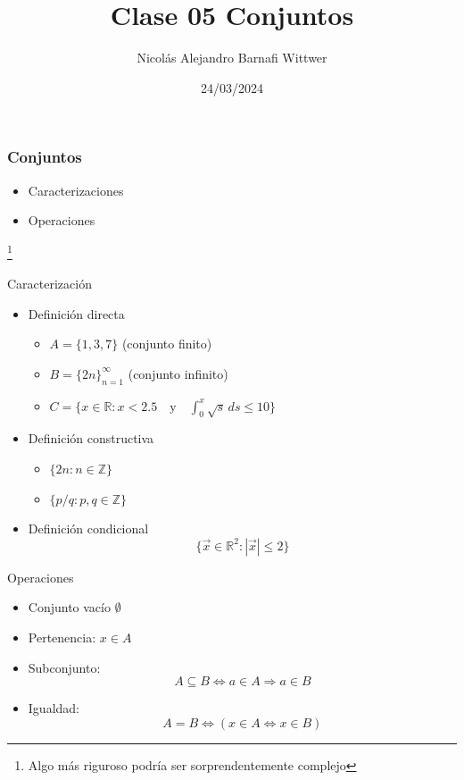 \documentclass[14pt,aspectratio=169,xcolor=dvipsnames]{beamer}
\title[short title]{Clase 05 Conjuntos}
\subtitle{}
\author[NA Barnafi] {Nicolás Alejandro Barnafi Wittwer}
\institute[UC|CMM] 
{
    Pontificia Universidad Católica de Chile \\
    Centro de Modelamiento Matemático
}
\date{24/03/2024}
\begin{document}
\begin{frame}
    \maketitle
\end{frame}
\begin{frame}\frametitle{Conjuntos}
    \begin{itemize}
        \item Caracterizaciones
        \item Operaciones
    \end{itemize}
    \footnote{Algo más riguroso podría ser sorprendentemente complejo}

    \vspace{1cm}
\end{frame}
\begin{frame}{Caracterización}
    \begin{itemize}
        \item Definición directa
            \begin{itemize}
                \item $A = \{1,3,7\}$ (conjunto finito)
                \item $B = \{2n\}_{n=1}^\infty$ (conjunto infinito)  
                \item $C = \{x \in \mathbb R: x < 2.5 \quad\text{y}\quad  \int_0^x \sqrt s \,ds \leq 10 \} $ 
            \end{itemize}
        \item Definición constructiva
            \begin{itemize}
                \item $\{ 2n : n \in \mathbb Z \}$ 
                \item $\{p / q : p,q \in \mathbb Z\}$
            \end{itemize}
        \item Definición condicional
            $$ \{\vec x \in \mathbb R^2 : |\vec x|\leq 2 \} $$
    \end{itemize}
\end{frame}
\begin{frame}{Operaciones}
    \begin{itemize}
        \item Conjunto vacío $\emptyset$
        \item Pertenencia: $ x \in A $
        \item Subconjunto:
            $$ A\subseteq B \Leftrightarrow a\in A \Rightarrow a \in B $$
        \item Igualdad: 
             $$ A = B  \Leftrightarrow  \left(x\in A \Leftrightarrow x\in B\right) $$
    \end{itemize}
    \pause
\end{frame}
\end{document}
